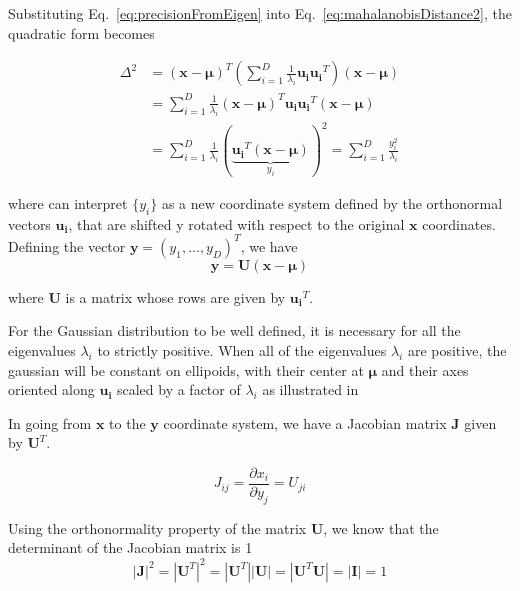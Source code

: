 Substituting Eq.~\ref{eq:precisionFromEigen} into Eq.~\ref{eq:mahalanobisDistance2}, the quadratic form becomes

\begin{equation}
\begin{split}
 \Delta^2 & = (\mathbf{x} - \bm{\mu})^T \left( \sum_{i=1}^{D}\frac{1}{\lambda_i}\mathbf{u_i} \mathbf{u_i}^T \right) (\mathbf{x} - \bm{\mu}) \\ 
 &=  \sum_{i=1}^{D}\frac{1}{\lambda_i}(\mathbf{x} - \bm{\mu})^T\mathbf{u_i} \mathbf{u_i}^T (\mathbf{x} - \bm{\mu}) \\
 &= \sum_{i=1}^{D}\frac{1}{\lambda_i} (\underbrace{\mathbf{u_i}^T (\mathbf{x} - \bm{\mu})}_{y_i})^2 = \sum_{i=1}^{D}\frac{y_i^2}{\lambda_i} 
\end{split}
\end{equation}

where can interpret $\{ y_i \}$ as a new coordinate system defined by the orthonormal vectors $\mathbf{u_i}$, that are shifted y rotated with respect to the original $\mathbf{x}$ coordinates.
Defining the vector $\mathbf{y} = (y_1, \dots, y_D)^T$, we have
\begin{equation}
 \mathbf{y} = \mathbf{U}(\mathbf{x}-\bm{\mu})
\end{equation}

where $\mathbf{U}$ is a matrix whose rows are given by $\mathbf{u_i}^T$. 

%

\vspace{0.3cm}
For the Gaussian distribution to be well defined, it is necessary for all the eigenvalues $\lambda_i$ to strictly positive.
When all of the eigenvalues $\lambda_i$ are positive, the gaussian will be constant on ellipoids, with their center at $\bm{\mu}$ and their axes oriented along $\mathbf{u_i}$ scaled by a factor of $\lambda_i$ as illustrated in
\vspace{0.3cm}

In going from $\mathbf{x}$ to the $\mathbf{y}$ coordinate system, we have a Jacobian matrix $\mathbf{J}$ given by $\mathbf{U}^T$.

\begin{equation}
 J_{ij} = \frac{\partial x_i}{\partial y_j} = U_{ji}
\end{equation}

Using the orthonormality property of the matrix $\mathbf{U}$, we know that the determinant of the Jacobian matrix is 1
\begin{equation}
  |\mathbf{J}|^2 = |\mathbf{U}^T|^2 = |\mathbf{U}^T||\mathbf{U}| =|\mathbf{U}^T \mathbf{U}| = |\mathbf{I}| = 1
\end{equation}

